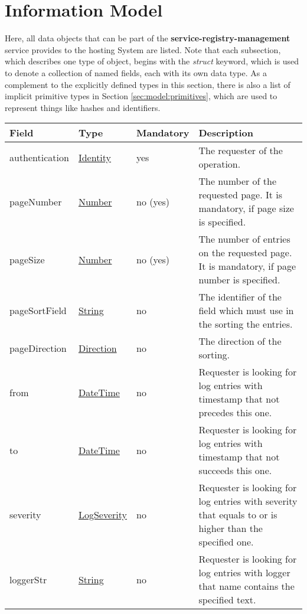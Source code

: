 \documentclass[a4paper]{arrowhead}
\newcommand{\pref}[1]{{\textcolor{ArrowheadGrey}{\hyperref[sec:model:primitives:#1]{#1}}}}
\begin{document}

\clearpage

\section{Information Model}
\label{sec:model}

Here, all data objects that can be part of the \textbf{service-registry-management} service
provides to the hosting System are listed.
Note that each subsection, which describes one type of object, begins with the \textit{struct} keyword, which is used to denote a collection of named fields, each with its own data type.
As a complement to the explicitly defined types in this section, there is also a list of implicit primitive types in Section \ref{sec:model:primitives}, which are used to represent things like hashes and identifiers.

\label{sec:model:LogRequest}
 
\begin{table}[ht!]
\begin{tabularx}{\textwidth}{| p{3cm} | p{3cm} | p{2cm} | X |} \hline
\rowcolor{gray!33} Field & Type & Mandatory & Description \\ \hline
authentication & \hyperref[sec:model:Identity]{Identity} & yes & The requester of the operation. \\ \hline
pageNumber & \pref{Number} & no (yes) & The number of the requested page. It is mandatory, if page size is specified. \\ \hline
pageSize & \pref{Number} & no (yes) & The number of entries on the requested page. It is mandatory, if page number is specified. \\ \hline
pageSortField & \pref{String} & no & The identifier of the field which must use in the sorting the entries. \\ \hline
pageDirection & \pref{Direction} & no & The direction of the sorting. \\ \hline
from & \pref{DateTime} & no & Requester is looking for log entries with timestamp that not precedes this one. \\ \hline
to & \pref{DateTime} & no & Requester is looking for log entries with timestamp that not succeeds this one. \\ \hline
severity & \pref{LogSeverity} & no & Requester is looking for log entries with severity that equals to or is higher than the specified one. \\ \hline
loggerStr &  \pref{String} & no & Requester is looking for log entries with logger that name contains the specified text. \\ \hline
\end{tabularx}
\end{table}
\end{document}
